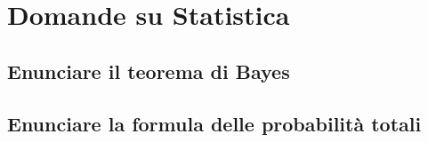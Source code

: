 \documentclass[\main/main.tex]{subfiles}
\begin{document}
\section{Domande su Statistica}
\subsection{Enunciare il teorema di Bayes}
\bayesTh
\subsection{Enunciare la formula delle probabilità totali}
\formulaProbTot

\clearpage

\clearpage

\clearpage

\clearpage

\end{document}
